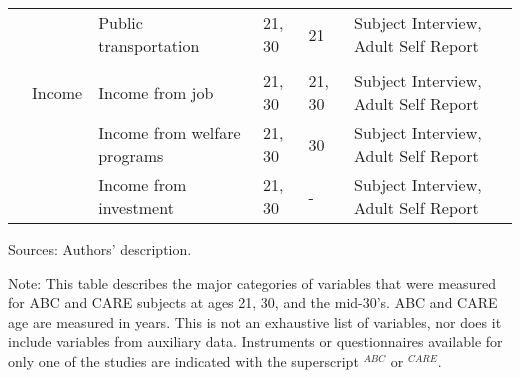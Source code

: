 \begin{sidewaystable}[H]
\begin{threeparttable}
\begin{tabular}{L{3.5cm} C{3.5cm} C{5cm} C{1.5cm} C{1.8cm} C{6cm}}
	&		&	Public transportation	&	21, 30	&	21	&	Subject Interview, Adult Self Report	\\
\\											
	&	Income	&	Income from job	&	21, 30	&	21, 30	&	Subject Interview, Adult Self Report	\\
	&		&	Income from welfare programs	&	21, 30	&	30	&	Subject Interview, Adult Self Report	\\
	&		&	Income from investment	&	21, 30	&	-	&	Subject Interview, Adult Self Report	\\										
 \bottomrule
\end{tabular}										
\begin{tablenotes}									
\scriptsize											
\item Sources: Authors' description. \\				
\item Note: This table describes the major categories of variables that were measured for ABC and CARE subjects at ages 21, 30, and the mid-30's. ABC and CARE age are measured in years. This is not an exhaustive list of variables, nor does it include variables from auxiliary data. Instruments or questionnaires available for only one of the studies are indicated with the superscript $^{ABC}$ or $^{CARE}$.			
\end{tablenotes}									
\end{threeparttable}								
\end{sidewaystable}											
